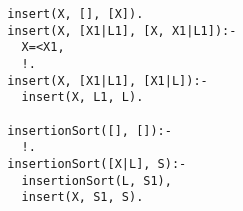 \documentclass[10pt, a4paper]{exam}
\begin{document}
\begin{questions}
\begin{parts}
\begin{solution}
\begin{lstlisting}
        insert(X, [], [X]).
        insert(X, [X1|L1], [X, X1|L1]):- 
          X=<X1, 
          !.
        insert(X, [X1|L1], [X1|L]):- 
          insert(X, L1, L).

        insertionSort([], []):- 
          !.
        insertionSort([X|L], S):- 
          insertionSort(L, S1), 
          insert(X, S1, S).
      \end{lstlisting}
    \end{solution}
  \end{parts}

\end{questions}
\end{document}
